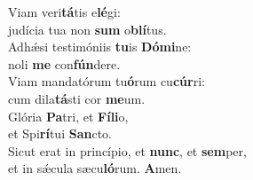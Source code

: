 \evenverse Viam veri\textbf{tá}tis e\textbf{lé}gi:~\*\\
\evenverse judícia tua non \textbf{sum} o\textbf{blí}tus.\\
\oddverse Adhǽsi testimóniis \textbf{tu}is \textbf{Dó}\textbf{mi}ne:~\*\\
\oddverse noli \textbf{me} con\textbf{fún}dere.\\
\evenverse Viam mandatórum tu\textbf{ó}rum cu\textbf{cúr}ri:~\*\\
\evenverse cum dila\textbf{tá}sti cor \textbf{me}um.\\
\oddverse Glória \textbf{Pa}tri, et \textbf{Fí}\textbf{li}o,~\*\\
\oddverse et Spi\textbf{rí}tui \textbf{San}cto.\\
\evenverse Sicut erat in princípio, et \textbf{nunc}, et \textbf{sem}per,~\*\\
\evenverse et in sǽcula sæcu\textbf{ló}rum. \textbf{A}men.\\
